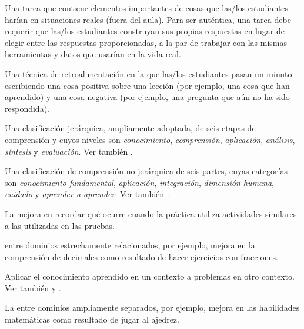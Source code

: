 \begin{description}
 Una tarea que contiene elementos importantes
de cosas que las/los estudiantes harían en situaciones reales (fuera del aula). Para
ser auténtica, una tarea debe requerir que las/los estudiantes construyan sus propias respuestas
en lugar de elegir entre las respuestas proporcionadas, a la par de trabajar con las mismas
herramientas y datos que usarían en la vida real.

 Una técnica de retroalimentación en la
que las/los estudiantes pasan un minuto escribiendo una cosa positiva sobre una lección
(por ejemplo, una cosa que han aprendido) y una cosa negativa (por ejemplo, una pregunta que aún no ha sido respondida).

 Una clasificación jerárquica, ampliamente adoptada,
de seis etapas de comprensión y cuyos niveles son \emph{conocimiento},
\emph{comprensión}, \emph{aplicación}, \emph{análisis}, \emph{síntesis} y
\emph{evaluación}.
Ver también .

 Una clasificación de comprensión no jerárquica de seis partes, 
cuyas categorías son \emph{conocimiento fundamental}, \emph{aplicación}, \emph{integración}, \emph{dimensión humana}, \emph{cuidado} y
\emph{aprender a aprender}. Ver también .

 La mejora en  recordar qué ocurre 
cuando la práctica utiliza actividades similares a las utilizadas en las pruebas.

  
entre dominios estrechamente relacionados, por ejemplo, mejora en la comprensión de decimales como resultado 
de hacer ejercicios con fracciones.

 Aplicar el conocimiento aprendido en un contexto a problemas en otro contexto.  Ver también
 y .

 La  entre dominios ampliamente separados, por ejemplo, mejora en las habilidades matemáticas como resultado de jugar al ajedrez.


\end{description}

